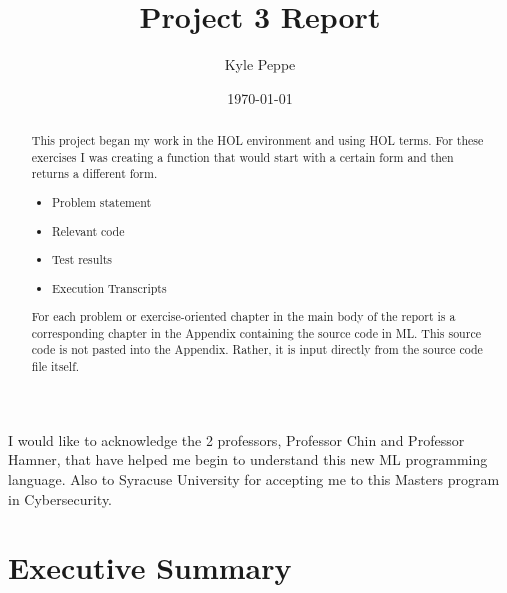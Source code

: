 \documentclass{report}
\title{Project 3 Report}
\author{Kyle Peppe}
\date{\today}
\begin{document}
\lstset{language=ML}


\maketitle{}

\begin{abstract}
  This project began my work in the HOL environment and using HOL
  terms. For these exercises I was creating a function that would
  start with a certain form and then returns a different form.
  \begin{itemize}
  \item Problem statement
  \item Relevant code
  \item Test results
  \item Execution Transcripts
  \end{itemize}
  
  For each problem or exercise-oriented chapter in the main body of
  the report is a corresponding chapter in the Appendix containing the
  source code in ML.  This source code is not pasted into the
  Appendix.  Rather, it is input directly from the source code file
  itself.

\end{abstract}

\begin{acknowledgments}
  I would like to acknowledge the 2 professors, Professor Chin and 
  Professor Hamner, that have helped me begin to understand this new
  ML programming language. Also to Syracuse University for accepting
  me to this Masters program in Cybersecurity.
\end{acknowledgments}

\tableofcontents{}


\chapter{Executive Summary}
\label{cha:executive-summary}
\end{document}

